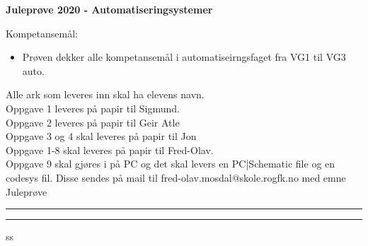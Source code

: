 \centerline{\bf Juleprøve 2020 - Automatiseringsystemer}  \bigskip

Kompetansemål:
\begin{itemize}[noitemsep]

	\item Prøven dekker alle kompetansemål i automatiseirngsfaget fra VG1 til VG3 auto.  
\end{itemize}

Alle ark som leveres inn skal ha elevens navn. \\ 

Oppgave 1 leveres på papir til Sigmund. \\
Oppgave 2 leveres på papir til Geir Atle \\
Oppgave 3 og 4 skal leveres på papir til Jon\\
Oppgave 1-8 skal leveres på papir til Fred-Olav. \\
Oppgave 9 skal gjøres i  på PC og det skal levers en PC|Schematic file og en codesys fil. Disse sendes på mail til fred-olav.mosdal@skole.rogfk.no med emne Juleprøve

\bigskip 
\hrule
\bigskip 
\hrule
\vfil \eject
ss
\eject
